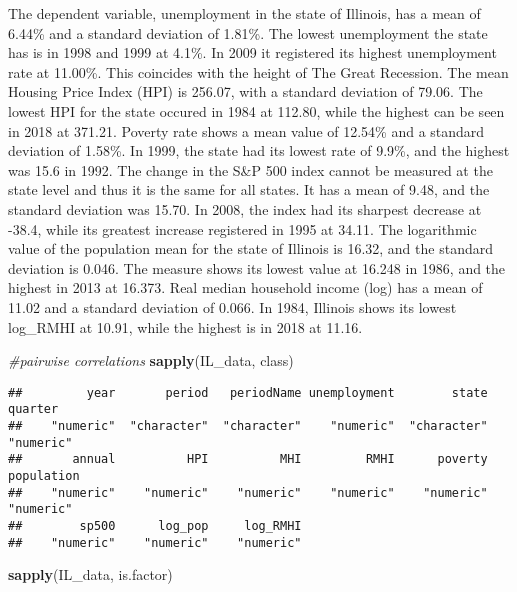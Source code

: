 \documentclass[
]{article}
\newenvironment{Shaded}{\begin{snugshade}}{\end{snugshade}}
\newcommand{\CommentTok}[1]{\textcolor[rgb]{0.56,0.35,0.01}{\textit{#1}}}
\newcommand{\KeywordTok}[1]{\textcolor[rgb]{0.13,0.29,0.53}{\textbf{#1}}}
\newcommand{\NormalTok}[1]{#1}
\begin{document}
The dependent variable, unemployment in the state of Illinois, has a
mean of 6.44\% and a standard deviation of 1.81\%. The lowest
unemployment the state has is in 1998 and 1999 at 4.1\%. In 2009 it
registered its highest unemployment rate at 11.00\%. This coincides with
the height of The Great Recession. The mean Housing Price Index (HPI) is
256.07, with a standard deviation of 79.06. The lowest HPI for the state
occured in 1984 at 112.80, while the highest can be seen in 2018 at
371.21. Poverty rate shows a mean value of 12.54\% and a standard
deviation of 1.58\%. In 1999, the state had its lowest rate of 9.9\%,
and the highest was 15.6 in 1992. The change in the S\&P 500 index
cannot be measured at the state level and thus it is the same for all
states. It has a mean of 9.48, and the standard deviation was 15.70. In
2008, the index had its sharpest decrease at -38.4, while its greatest
increase registered in 1995 at 34.11. The logarithmic value of the
population mean for the state of Illinois is 16.32, and the standard
deviation is 0.046. The measure shows its lowest value at 16.248 in
1986, and the highest in 2013 at 16.373. Real median household income
(log) has a mean of 11.02 and a standard deviation of 0.066. In 1984,
Illinois shows its lowest log\_RMHI at 10.91, while the highest is in
2018 at 11.16.

\begin{Shaded}
\begin{Highlighting}[]
\CommentTok{#pairwise correlations}
\KeywordTok{sapply}\NormalTok{(IL_data, class)}
\end{Highlighting}
\end{Shaded}

\begin{verbatim}
##         year       period   periodName unemployment        state      quarter 
##    "numeric"  "character"  "character"    "numeric"  "character"    "numeric" 
##       annual          HPI          MHI         RMHI      poverty   population 
##    "numeric"    "numeric"    "numeric"    "numeric"    "numeric"    "numeric" 
##        sp500      log_pop     log_RMHI 
##    "numeric"    "numeric"    "numeric"
\end{verbatim}

\begin{Shaded}
\begin{Highlighting}[]
\KeywordTok{sapply}\NormalTok{(IL_data, is.factor)}
\end{Highlighting}
\end{Shaded}
\end{document}
